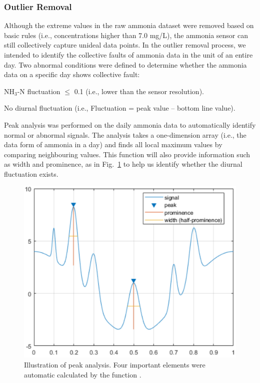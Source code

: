 \subsubsection{Outlier Removal}
Although the extreme values in the raw ammonia dataset were removed based on basic rules (i.e., concentrations higher than 7.0 mg/L), the ammonia sensor can still collectively capture unideal data points. In the outlier removal process, we intended to identify the collective faults of ammonia data in the unit of an entire day. Two abnormal conditions were defined to determine whether the ammonia data on a specific day shows collective fault:

\noindent
\begin{myenumerate}
    \item NH$_{3}$-N fluctuation $\le$ 0.1 (i.e., lower than the sensor resolution).
    \item No diurnal fluctuation (i.e., Fluctuation = peak value – bottom line value).
\end{myenumerate}

Peak analysis was performed on the daily ammonia data to automatically identify normal or abnormal signals. The analysis takes a one-dimension array (i.e., the data form of ammonia in a day) and finds all local maximum values by comparing neighbouring values. This function will also provide information such as width and prominence, as in Fig.~\ref{fig:prominence} to help us identify whether the diurnal fluctuation exists.

\begin{figure}[!ht]
    \centering
    \includegraphics[width=0.7\columnwidth]{imgs/pre-processing/prominence.png}
    \caption{Illustration of peak analysis. Four important elements were automatic calculated by the function \citep{mathworksDocumentationFindpeaks2022}.}
    \label{fig:prominence}
 \end{figure}

